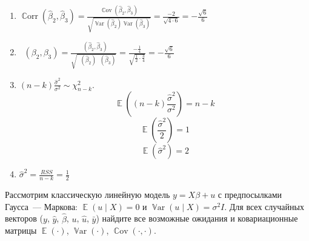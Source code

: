 \documentclass[12pt]{article}
\DeclareMathOperator{\Cov}{\mathbb{C}ov}
\DeclareMathOperator{\Corr}{\mathbb{C}orr}
\DeclareMathOperator{\Var}{\mathbb{V}ar}
\DeclareMathOperator{\hVar}{\widehat{\Var}}
\DeclareMathOperator{\hCov}{\widehat{\Cov}}
\DeclareMathOperator{\hCorr}{\widehat{\Corr}}
\DeclareMathOperator{\E}{\mathbb{E}}
\newcommand{\hb}{\hat{\beta}}
\newcommand{\hy}{\hat{y}}
\newcommand{\RSS}{RSS}
\newenvironment{sol}{}{}
\begin{document}
\begin{problem}
\begin{sol}
\begin{enumerate}
\item $\Corr(\hb_2,\hb_3)=\frac{\Cov(\hb_2,\hb_3)}{\sqrt{\Var(\hb_2)\Var(\hb_3)}}=\frac{-2}{\sqrt{4\cdot6}}=-\frac{\sqrt6}{6}$

\item $\hCorr(\beta_2,\beta_3)=\frac{\hCov(\hb_2,\hb_3)}{\sqrt{\hVar(\hb_2)\hVar(\hb_3)}}=\frac{-\frac14}{\sqrt{\frac12\cdot\frac34}}=-\frac{\sqrt6}{6}$

\item $(n-k)\frac{\hat\sigma^2}{\sigma^2}\sim\chi^2_{n-k}$.
\[
\E\left((n-k)\frac{\hat\sigma^2}{\sigma^2}\right)=n-k
\]
\[
\E\left(\frac{\hat\sigma^2}{2}\right)=1
\]
\[
\E(\hat\sigma^2)=2
\]

\item $\hat\sigma^2=\frac{\RSS}{n-k}=\frac{1}{2}$

\end{enumerate}

\end{sol}
\end{problem}





\begin{problem}
Рассмотрим классическую линейную модель $y=X\beta + u$ с предпосылками Гаусса~— Маркова: $\E(u \mid X) = 0$ и $\Var(u \mid X) = \sigma^2 I$.
Для всех случайных векторов ($y$, $\hy$, $\hb$, $u$, $\hat u$, $\bar y$) найдите все возможные ожидания и ковариационные матрицы
$\E(\cdot)$, $\Var(\cdot)$, $\Cov(\cdot, \cdot)$.
\begin{sol}
\end{sol}
\end{problem}
\end{document}
